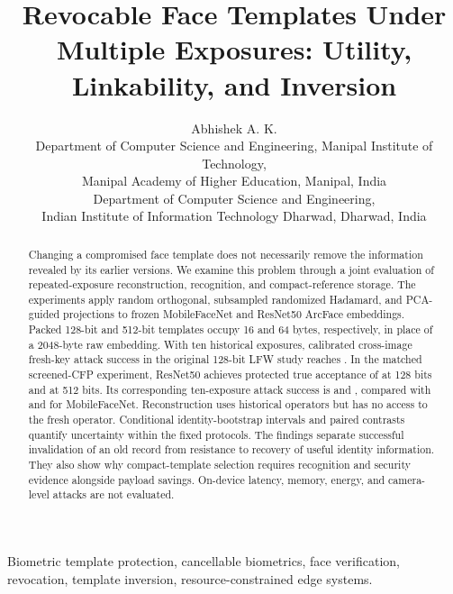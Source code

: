 \documentclass[10pt,journal]{IEEEtran}
\begin{document}
\title{Revocable Face Templates Under Multiple Exposures: Utility, Linkability, and Inversion}
\author{Abhishek A. K.\\[0.6ex]
{\normalfont\small Department of Computer Science and Engineering, Manipal Institute of Technology,\\
Manipal Academy of Higher Education, Manipal, India\\
Department of Computer Science and Engineering,\\
Indian Institute of Information Technology Dharwad, Dharwad, India}}
\maketitle
\begin{abstract}
Changing a compromised face template does not necessarily remove the information revealed by its earlier versions. We examine this problem through a joint evaluation of repeated-exposure reconstruction, recognition, and compact-reference storage. The experiments apply random orthogonal, subsampled randomized Hadamard, and PCA-guided projections to frozen MobileFaceNet and ResNet50 ArcFace embeddings. Packed 128-bit and 512-bit templates occupy 16 and 64 bytes, respectively, in place of a 2048-byte raw embedding. With ten historical exposures, calibrated cross-image fresh-key attack success in the original 128-bit LFW study reaches \LfwBaselineAsr{}. In the matched screened-CFP experiment, ResNet50 achieves protected true acceptance of \RnetSmallTar{} at 128 bits and \RnetLargeTar{} at 512 bits. Its corresponding ten-exposure attack success is \RnetSmallAsr{} and \RnetLargeAsr{}, compared with \MbfSmallAsr{} and \MbfLargeAsr{} for MobileFaceNet. Reconstruction uses historical operators but has no access to the fresh operator. Conditional identity-bootstrap intervals and paired contrasts quantify uncertainty within the fixed protocols. The findings separate successful invalidation of an old record from resistance to recovery of useful identity information. They also show why compact-template selection requires recognition and security evidence alongside payload savings. On-device latency, memory, energy, and camera-level attacks are not evaluated.
\end{abstract}
\begin{IEEEkeywords}
Biometric template protection, cancellable biometrics, face verification, revocation, template inversion, resource-constrained edge systems.
\end{IEEEkeywords}







\FloatBarrier


\end{document}
